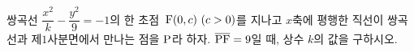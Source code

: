 쌍곡선 $\dfrac{x^2}{k}-\dfrac{y^2}{9}=-1$의 한 초점~$\pt{F}(0{,}\mkern3mu\mathopen{}c)\ (c>0)$를 지나고 $x$축에 평행한 직선이 쌍곡선과 제$1$사분면에서 만나는 점을 $\mathrm{P}$라 하자. $\overline{\mathrm{PF}}=9$일 때, 상수 $k$의 값을 구하시오.
